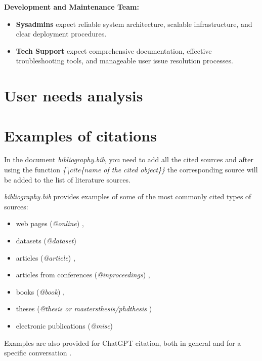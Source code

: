 \documentclass[]{VUMIFTemplateClass}
\begin{document}
\textbf{Development and Maintenance Team:}
\begin{itemize}
    \item \textbf{Sysadmins} expect reliable system architecture, scalable infrastructure, and clear deployment procedures.
    \item \textbf{Tech Support} expect comprehensive documentation, effective troubleshooting tools, and manageable user issue resolution processes.
\end{itemize}






\section{User needs analysis}





\printbibliography[title = {References and sources}]

\appendix
\renewcommand{\thesection}{Appendix \arabic{section}. }

\section{\phantom{Appendix} Examples of citations}
In the document \textit{bibliography.bib}, you need to add all the cited sources and after using the function \textit{\{\textbackslash cite\{name of the cited object\}\}} the corresponding source will be added to the list of literature sources.


\textit{bibliography.bib} provides examples of some of the most commonly cited types of sources:
\begin{itemize}
    \item web pages (\textit{@online}) \cite{PvzInternetinisPuslapis},
    \item datasets (\textit{@dataset}) \cite{dataset}
    \item articles (\textit{@article}) \cite{PvzStraipsnLt, PvzStraipsnEn}, 
    \item articles from conferences (\textit{@inproceedings}) \cite{PvzKonfLt, PvzKonfEn}, 
    \item books (\textit{@book}) \cite{PvzKnygLt, PvzKnygEn}, 
    \item theses (\textit{@thesis or mastersthesis/phdthesis} \cite{PvzMagistrLt, PvzPhdEn})
    \item electronic publications (\textit{@misc}) \cite{PvzElPubLt, PvzElPubEn}
\end{itemize}

Examples are also provided for ChatGPT citation, both in general \cite{chatgpt_bendrai} and for a specific conversation \cite{chatgpt_pokalbis}.
\end{document}
